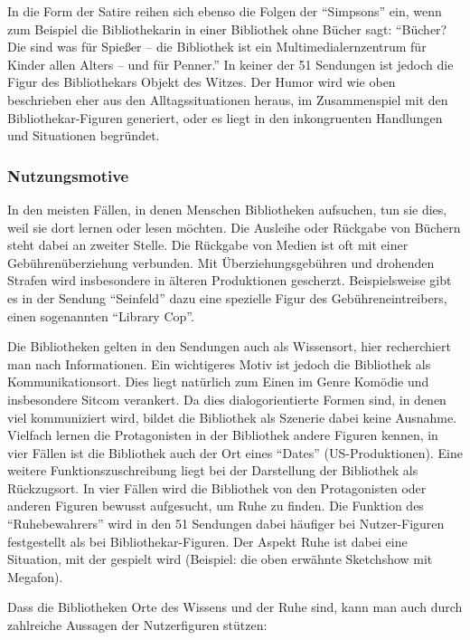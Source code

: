 In die Form der Satire reihen sich ebenso die Folgen der
\enquote{Simpsons} ein, wenn zum Beispiel die Bibliothekarin in einer
Bibliothek ohne Bücher sagt: \enquote{Bücher? Die sind was für Spießer
-- die Bibliothek ist ein Multimedialernzentrum für Kinder allen Alters
-- und für Penner.} In keiner der 51 Sendungen ist jedoch die Figur des
Bibliothekars Objekt des Witzes. Der Humor wird wie oben beschrieben
eher aus den Alltagssituationen heraus, im Zusammenspiel mit den
Bibliothekar-Figuren generiert, oder es liegt in den inkongruenten
Handlungen und Situationen begründet.

\subsubsection{Nutzungsmotive}\label{nutzungsmotive}

In den meisten Fällen, in denen Menschen Bibliotheken aufsuchen, tun sie
dies, weil sie dort lernen oder lesen möchten. Die Ausleihe oder
Rückgabe von Büchern steht dabei an zweiter Stelle. Die Rückgabe von
Medien ist oft mit einer Gebührenüberziehung verbunden. Mit
Überziehungsgebühren und drohenden Strafen wird insbesondere in älteren
Produktionen gescherzt. Beispielsweise gibt es in der Sendung
\enquote{Seinfeld} dazu eine spezielle Figur des Gebühreneintreibers,
einen sogenannten \enquote{Library Cop}.

Die Bibliotheken gelten in den Sendungen auch als Wissensort, hier
recherchiert man nach Informationen. Ein wichtigeres Motiv ist jedoch
die Bibliothek als Kommunikationsort. Dies liegt natürlich zum Einen im
Genre Komödie und insbesondere Sitcom verankert. Da dies
dialogorientierte Formen sind, in denen viel kommuniziert wird, bildet
die Bibliothek als Szenerie dabei keine Ausnahme. Vielfach lernen die
Protagonisten in der Bibliothek andere Figuren kennen, in vier Fällen
ist die Bibliothek auch der Ort eines \enquote{Dates} (US-Produktionen).
Eine weitere Funktionszuschreibung liegt bei der Darstellung der
Bibliothek als Rückzugsort. In vier Fällen wird die Bibliothek von den
Protagonisten oder anderen Figuren bewusst aufgesucht, um Ruhe zu
finden. Die Funktion des \enquote{Ruhebewahrers} wird in den 51
Sendungen dabei häufiger bei Nutzer-Figuren festgestellt als bei
Bibliothekar-Figuren. Der Aspekt Ruhe ist dabei eine Situation, mit der
gespielt wird (Beispiel: die oben erwähnte Sketchshow mit Megafon).

Dass die Bibliotheken Orte des Wissens und der Ruhe sind, kann man auch
durch zahlreiche Aussagen der Nutzerfiguren stützen:

